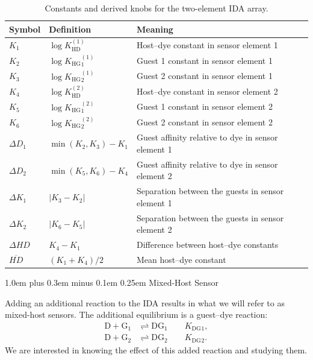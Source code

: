\documentclass[11pt]{article}
\makeatletter
\newcommand{\KHD}{K_{\mathrm{HD}}}
\newcommand{\KHG}{K_{\mathrm{HG}}}
\newcommand{\KDG}{K_{\mathrm{DG}}}
\renewcommand\subsection{\@startsection{subsection}{2}{0pt}%
    {1.0em plus 0.3em minus 0.1em}%
    {0.25em}%
    {\normalfont\large\bfseries\color{reportteal}}}
\makeatother
\begin{document}
\begin{table}[H]
\centering
\caption{Constants and derived knobs for the two-element IDA array.}
\label{tab:ida_array_constants}
\renewcommand{\arraystretch}{1.15}
\begin{tabular}{lll}
\toprule
Symbol & Definition & Meaning \\
\midrule
$K_1$ & $\log \KHD^{(1)}$ & Host--dye constant in sensor element 1 \\
$K_2$ & $\log \KHG{}_{1}^{(1)}$ & Guest 1 constant in sensor element 1 \\
$K_3$ & $\log \KHG{}_{2}^{(1)}$ & Guest 2 constant in sensor element 1 \\
$K_4$ & $\log \KHD^{(2)}$ & Host--dye constant in sensor element 2 \\
$K_5$ & $\log \KHG{}_{1}^{(2)}$ & Guest 1 constant in sensor element 2 \\
$K_6$ & $\log \KHG{}_{2}^{(2)}$ & Guest 2 constant in sensor element 2 \\
$\Delta D_1$ & $\min(K_2,K_3)-K_1$ & Guest affinity relative to dye in sensor element 1 \\
$\Delta D_2$ & $\min(K_5,K_6)-K_4$ & Guest affinity relative to dye in sensor element 2 \\
$\Delta K_1$ & $|K_3-K_2|$ & Separation between the guests in sensor element 1 \\
$\Delta K_2$ & $|K_6-K_5|$ & Separation between the guests in sensor element 2 \\
$\Delta HD$ & $K_4-K_1$ & Difference between host--dye constants \\
$\overline{HD}$ & $(K_1+K_4)/2$ & Mean host--dye constant \\
\bottomrule
\end{tabular}
\end{table}

\subsection{Mixed-Host Sensor}

Adding an additional reaction to the IDA results in what we will refer to as
mixed-host sensors. The additional equilibrium is a guest--dye reaction:
\begin{align}
\mathrm{D} + \mathrm{G}_1 &\rightleftharpoons \mathrm{DG}_1 \qquad \KDG{}_1,\\
\mathrm{D} + \mathrm{G}_2 &\rightleftharpoons \mathrm{DG}_2 \qquad \KDG{}_2.
\end{align}
We are interested in knowing the effect of this added reaction and studying them.
\end{document}
